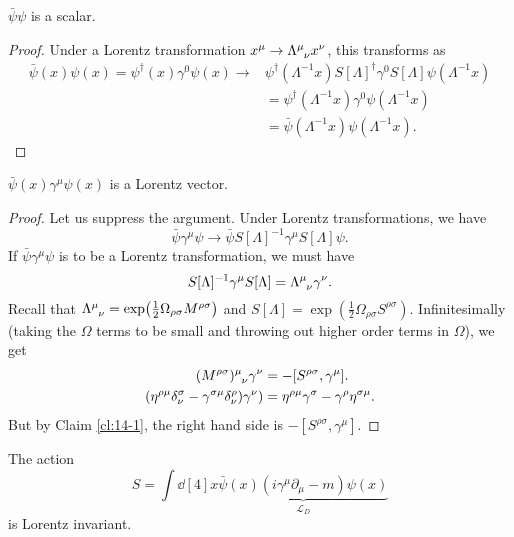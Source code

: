 \begin{claim}
  $\bar \psi \psi$ is a scalar.
\end{claim}
\begin{proof}
  Under a Lorentz transformation $x^{\mu} \to \Lambda\indices{^{\mu}_{\nu}} x^{\nu}$, this transforms as
  \begin{align}
    \bar\psi(x)\psi(x) = \psi^{\dagger}(x) \gamma^0 \psi(x) \to &\psi^{\dagger}(\Lambda^{-1} x) S[\Lambda]^{\dagger} \gamma^0 S[\Lambda] \psi(\Lambda^{-1} x) \\
								&= \psi^{\dagger}(\Lambda^{-1} x)\gamma^0 \psi(\Lambda^{-1} x) \\
								&= \bar \psi(\Lambda^{-1} x) \psi(\Lambda^{-1} x).
  \end{align}
\end{proof}
\begin{claim}
  $\bar \psi(x) \gamma^{\mu} \psi(x)$ is a Lorentz vector.
\end{claim}
\begin{proof}
  Let us suppress the argument. Under Lorentz transformations, we have
  \begin{equation}
    \bar\psi \gamma^{\mu} \psi \to \bar\psi S[\Lambda]^{-1} \gamma^{\mu} S[\Lambda]\psi.
  \end{equation}
  If $\bar\psi \gamma^{\mu} \psi$ is to be a Lorentz transformation, we must have
  \begin{equation}
    \label{eq:14-1}
    S[\Lambda]^{-1} \gamma^{\mu} S[\Lambda] = \Lambda \indices{^{\mu}_{\nu}} \gamma^{\nu}.
  \end{equation}
  Recall that $\Lambda \indices{^{\mu}_{\nu}} = \exp(\frac{1}{2} \Omega_{\rho\sigma} M^{\rho\sigma})$ and $S[\Lambda] = \exp(\frac{1}{2} \Omega_{\rho\sigma} S^{\rho\sigma})$.
  Infinitesimally (taking the $\Omega$ terms to be small and throwing out higher order terms in $\Omega$), we get
  \begin{align}
    (M^{\rho\sigma}) \indices{^{\mu}_{\nu}} \gamma^{\nu} &= - [S^{\rho\sigma}, \gamma^{\mu}]. \\
    (\eta^{\rho\mu} \delta^{\sigma}_{\nu} - \gamma^{\sigma\mu} \delta^{\rho}_{\nu}) \gamma^{\nu}) &= \eta^{\rho\mu} \gamma^{\sigma} - \gamma^{\rho} \eta^{\sigma\mu}.
  \end{align}
  But by Claim \ref{cl:14-1}, the right hand side is $-[S^{\rho\sigma}, \gamma^{\mu}]$.
\end{proof}
\begin{corollary}
  The action
  \begin{equation}
    \label{eq:14-dirac-lagrangian}
    \boxed{ S = \int \dd[4]{x} \underbrace{\bar\psi(x) (i \gamma^{\mu} \partial_{\mu} - m) \psi(x)}_{\mathcal{L}_D} }
  \end{equation}
  is Lorentz invariant.
\end{corollary}

